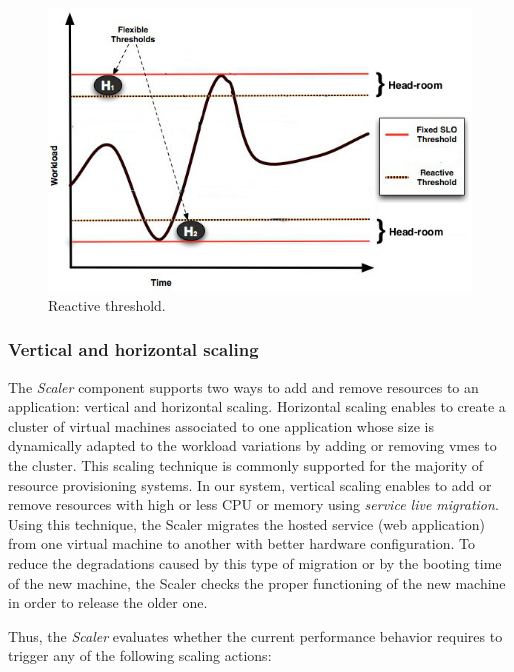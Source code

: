 \begin{figure}[htb]
  \begin{center}
    \includegraphics[width=.85\linewidth]{images/thresholdGraphic.jpg}
  \end{center}
\vspace{-5mm}
  \caption{Reactive threshold.}
  \label{threshold}
\end{figure}

\subsubsection{Vertical and horizontal scaling}

The \emph{Scaler} component supports two ways to add and remove resources to an application: vertical and horizontal scaling.
Horizontal scaling enables to create a cluster of virtual machines associated to one application whose size is dynamically adapted to the workload variations by adding or removing vmes to the cluster. This scaling technique is commonly supported for the majority of resource provisioning systems. In our system, vertical scaling enables to add or remove resources with high or less CPU or memory using \emph{service live migration}. Using this technique, the Scaler migrates the hosted service (web application) from one virtual machine to another with better hardware configuration. To reduce the degradations caused by this type of migration or by the booting time of the new machine, the Scaler checks the proper functioning of the new machine in order to release the older one.

Thus, the \emph{Scaler} evaluates whether the current performance behavior requires to trigger any of the following scaling actions:

